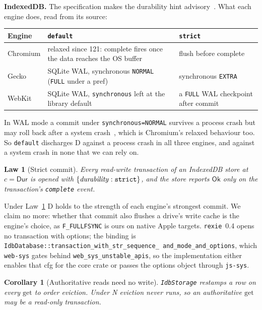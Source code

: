 \documentclass[journal]{IEEEtran}
\newtheorem{corollary}{Corollary}
\newtheorem{law}{Law}
\newcommand{\Ok}{\mathsf{Ok}}
\newcommand{\Durable}{\mathsf{Dur}}
\newcommand{\jsq}[1]{\texttt{#1}}
\begin{document}
\textbf{IndexedDB.}  The specification makes the durability hint advisory~\cite{IndexedDB3}.
What each engine does, read from its source:

\begin{center}
\footnotesize\raggedright
\begin{tabular}{@{}p{}p{}p{}@{}}
\toprule
Engine & \jsq{default} & \jsq{strict}\\
\midrule
Chromium & relaxed since 121: complete fires once the data reaches the OS
buffer~\cite{ChromeDurability} & flush before complete\\
Gecko & SQLite WAL, synchronous \texttt{NORMAL} (\texttt{FULL} under a
pref)~\cite{GeckoIDB} & synchronous \texttt{EXTRA}\\
WebKit & SQLite WAL, \texttt{synchronous} left at the library default~\cite{WebKitIDB} &
a \texttt{FULL} WAL checkpoint after commit\\
\bottomrule
\end{tabular}
\end{center}

In WAL mode a commit under \texttt{synchronous=NORMAL} survives a process crash but may roll
back after a system crash~\cite{SQLiteWAL}, which is Chromium's relaxed behaviour too.  So
\jsq{default} discharges D against a process crash in all three engines, and against a
system crash in none that we can rely on.

\begin{law}[Strict commit]\label{law:strict}
Every read-write transaction of an IndexedDB store at $c=\Durable$ is opened with
$\{\mathit{durability}:\text{\jsq{strict}}\}$, and the store reports $\Ok$ only on the
transaction's \texttt{complete} event.
\end{law}

Under Law~\ref{law:strict} D holds to the strength of each engine's strongest commit.  We
claim no more: whether that commit also flushes a drive's write cache is the engine's
choice, as \texttt{F\_FULLFSYNC} is ours on native Apple targets.  \texttt{rexie}~0.4 opens
no transaction with options; the binding is
\texttt{IdbDatabase::\allowbreak transaction\_with\_\allowbreak str\_sequence\_\allowbreak
  and\_mode\_\allowbreak and\_options}, which
\texttt{web-sys} gates behind \texttt{web\_sys\_unstable\_apis}, so the implementation either
enables that cfg for the core crate or passes the options object through \texttt{js-sys}.

\begin{corollary}[Authoritative reads need no write]\label{cor:idbread}
\texttt{IdbStorage} restamps a row on every $\mathrm{get}$ to order eviction.  Under N
eviction never runs, so an authoritative $\mathrm{get}$ may be a read-only transaction.
\end{corollary}
\end{document}
